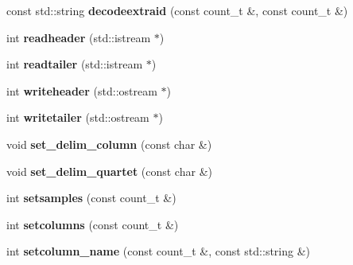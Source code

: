 \begin{DoxyCompactItemize}
\item 
\hypertarget{classmapfile__header_ab9494236567f143b9349954df315bc97}{const std\-::string {\bfseries decodeextraid} (const count\-\_\-t \&, const count\-\_\-t \&)}\label{classmapfile__header_ab9494236567f143b9349954df315bc97}

\item 
\hypertarget{classmapfile__header_a23608be1047a2efe177f7677606a5e13}{int {\bfseries readheader} (std\-::istream $\ast$)}\label{classmapfile__header_a23608be1047a2efe177f7677606a5e13}

\item 
\hypertarget{classmapfile__header_a82dbe0a52440ed06c714fb5d0608828d}{int {\bfseries readtailer} (std\-::istream $\ast$)}\label{classmapfile__header_a82dbe0a52440ed06c714fb5d0608828d}

\item 
\hypertarget{classmapfile__header_a878bfe01cdf2bdd58d6477c0a410d2fe}{int {\bfseries writeheader} (std\-::ostream $\ast$)}\label{classmapfile__header_a878bfe01cdf2bdd58d6477c0a410d2fe}

\item 
\hypertarget{classmapfile__header_ad76962a42d8fb8ca069f966296e9ce21}{int {\bfseries writetailer} (std\-::ostream $\ast$)}\label{classmapfile__header_ad76962a42d8fb8ca069f966296e9ce21}

\item 
\hypertarget{classmapfile__header_a566b82d9b4274a479fb76c05942c2b39}{void {\bfseries set\-\_\-delim\-\_\-column} (const char \&)}\label{classmapfile__header_a566b82d9b4274a479fb76c05942c2b39}

\item 
\hypertarget{classmapfile__header_af7e94e8b42c79431233ce4d671dafe9d}{void {\bfseries set\-\_\-delim\-\_\-quartet} (const char \&)}\label{classmapfile__header_af7e94e8b42c79431233ce4d671dafe9d}

\item 
\hypertarget{classmapfile__header_a19424ef4746e80486df923ba944f4b9e}{int {\bfseries setsamples} (const count\-\_\-t \&)}\label{classmapfile__header_a19424ef4746e80486df923ba944f4b9e}

\item 
\hypertarget{classmapfile__header_ae6533023cdbfde00e912f91606db3180}{int {\bfseries setcolumns} (const count\-\_\-t \&)}\label{classmapfile__header_ae6533023cdbfde00e912f91606db3180}

\item 
\hypertarget{classmapfile__header_af160e5f71e84b4ff8e9b0de719601b4f}{int {\bfseries setcolumn\-\_\-name} (const count\-\_\-t \&, const std\-::string \&)}\label{classmapfile__header_af160e5f71e84b4ff8e9b0de719601b4f}


\end{DoxyCompactItemize}
